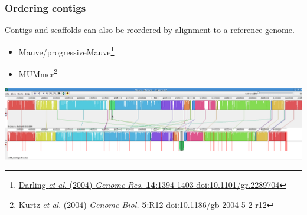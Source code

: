 \begin{frame}
  \frametitle{Ordering contigs}
  Contigs and scaffolds can also be reordered by alignment to a reference genome.\\
  \begin{itemize}
    \item Mauve/progressiveMauve\footnote{\tiny{\href{http://dx.doi.org/10.1101/gr.2289704}{Darling \textit{et al}. (2004) \textit{Genome Res.} \textbf{14}:1394-1403 doi:10.1101/gr.2289704}}}
    \item MUMmer\footnote{\tiny{\href{http://dx.doi.org/10.1186/gb-2004-5-2-r12}{Kurtz \textit{et al}. (2004) \textit{Genome Biol.} \textbf{5}:R12 doi:10.1186/gb-2004-5-2-r12}}}
  \end{itemize}
  \begin{center}
    \includegraphics[width=1\textwidth]{images/mauve_output}
  \end{center}    
\end{frame}
